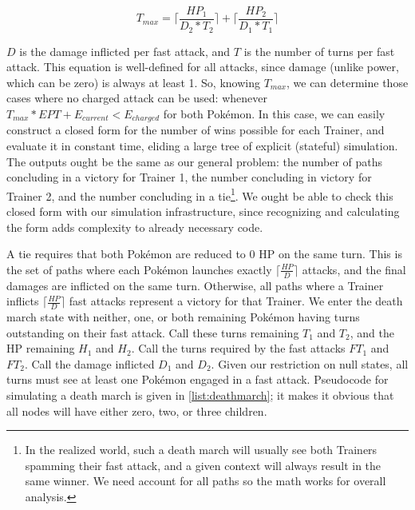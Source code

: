 \[ T_{max} = \lceil\frac{HP_1}{D_2 * T_2}\rceil + \lceil\frac{HP_2}{D_1 * T_1}\rceil \]

$D$ is the damage inflicted per fast attack, and $T$ is the number of turns per fast attack.
This equation is well-defined for all attacks, since damage (unlike power,
  which can be zero) is always at least 1.
So, knowing $T_{max}$, we can determine those cases where no charged attack
  can be used: whenever $T_{max} * EPT + E_{current} < E_{charged}$ for both Pokémon.
In this case, we can easily construct a closed form for the number of wins
  possible for each Trainer, and evaluate it in constant time, eliding
  a large tree of explicit (stateful) simulation.
The outputs ought be the same as our general problem: the number of paths
  concluding in a victory for Trainer 1, the number concluding in victory for
  Trainer 2, and the number concluding in a tie\footnote{In the realized world,
  such a death march will usually see both Trainers spamming their fast attack,
  and a given context will always result in the same winner. We need account
  for all paths so the math works for overall analysis.}.
We ought be able to check this closed form with our simulation infrastructure,
  since recognizing and calculating the form adds complexity to
  already necessary code.

A tie requires that both Pokémon are reduced to 0 HP on the same turn.
This is the set of paths where each Pokémon launches exactly $\lceil\frac{HP}{D}\rceil$
  attacks, and the final damages are inflicted on the same turn.
Otherwise, all paths where a Trainer inflicts $\lceil\frac{HP}{D}\rceil$ fast attacks
  represent a victory for that Trainer.
We enter the death march state with neither, one, or both remaining Pokémon having
  turns outstanding on their fast attack.
Call these turns remaining $T_1$ and $T_2$, and the HP remaining $H_1$ and $H_2$.
Call the turns required by the fast attacks $FT_1$ and $FT_2$.
Call the damage inflicted $D_1$ and $D_2$.
Given our restriction on null states, all turns must see at least one Pokémon engaged
  in a fast attack.
Pseudocode for simulating a death march is given in \autoref{list:deathmarch}; it
  makes it obvious that all nodes will have either zero, two, or three children.

